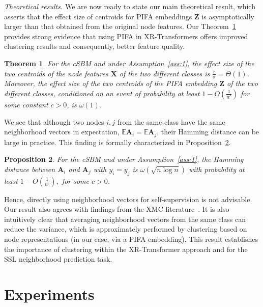 \documentclass{article} \usepackage{iclr2022_conference,times}
\newtheorem{theorem}{Theorem}[section]
\newtheorem{proposition}[theorem]{Proposition}
\begin{document}
\textit{Theoretical results. }We are now ready to state our main theoretical result, which asserts that the effect size of centroids for PIFA embeddings $\mathbf{Z}$ is asymptotically larger than that obtained from the original node features. Our Theorem~\ref{thm:main} provides strong evidence that using PIFA in XR-Transformers offers improved clustering results and consequently, better feature quality.
\begin{theorem}\label{thm:main}
	For the cSBM and under Assumption~\ref{ass:1}, the effect size of the two centroids of the node features $\mathbf{X}$ of the two different classes is $\frac{r}{\sigma} = \Theta(1)$. Moreover, the effect size of the two centroids of the PIFA embedding $\mathbf{Z}$ of the two different classes, conditioned on an event of probability at least $1-O(\frac{1}{n^c})$ for some constant $c>0$, is $\omega(1)$.
\end{theorem}
We see that although two nodes $i,j$ from the same class have the same neighborhood vectors in expectation, $\mathbb{E}\mathbf{A}_i = \mathbb{E}\mathbf{A}_j$, their Hamming distance can be large in practice. This finding is formally characterized in Proposition~\ref{prop:Bino}.
\begin{proposition}\label{prop:Bino}
	For the cSBM and under Assumption~\ref{ass:1}, the Hamming distance between $\mathbf{A}_i$ and $\mathbf{A}_j$ with $y_i = y_j$ is $\omega(\sqrt{n\log n})$ with probability at least $1-O(\frac{1}{n^c}),$ for some $c>0$.
\end{proposition}
Hence, directly using neighborhood vectors for self-supervision is not advisable. Our result also agrees with findings from the XMC literature~\citep{chang2020taming}. It is also intuitively clear that averaging neighborhood vectors from the same class can reduce the variance, which is approximately performed by clustering based on node representations (in our case, via a PIFA embedding). This result establishes the importance of clustering within the XR-Transformer approach and for the SSL neighborhood prediction task.

\vspace{-0.3cm}
\section{Experiments}\label{sec:exp}
\end{document}
